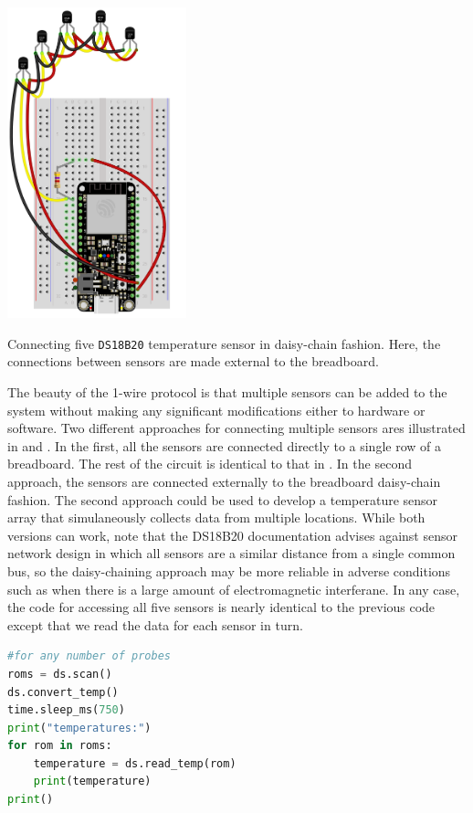\begin{marginfigure}[9 cm]
	\begin{center}
		\includegraphics[height=9cm]{Images/fiveDS18B20series.png}
		\caption[DS18B20 daisy chain]{Connecting five \texttt{DS18B20} temperature sensor in daisy-chain fashion.  Here, the connections between sensors are made external to the breadboard.}
	\end{center}
\end{marginfigure}

The beauty of the 1-wire protocol is that multiple sensors can be added to the system without making any significant modifications either to hardware or software.
Two different approaches for connecting multiple sensors ares illustrated in  and . 
In the first, all the sensors are connected directly to a single row of a breadboard.  
The rest of the circuit is identical to that in . 
In the second approach, the sensors are connected externally to the breadboard daisy-chain fashion.  
The second approach could be used to develop a temperature sensor array that simulaneously collects data from multiple locations.
While both versions can work, note that the DS18B20 documentation advises against sensor network design in which all sensors are a similar distance from a single common bus, so the daisy-chaining approach may be more reliable in adverse conditions such as when there is a large amount of electromagnetic interferane.
In any case, the code for accessing all five sensors is nearly identical to the previous code except that we read the data for each sensor in turn. 

\begin{lstlisting}[language=Python]
#for any number of probes
roms = ds.scan()
ds.convert_temp()
time.sleep_ms(750)
print("temperatures:")  
for rom in roms:
	temperature = ds.read_temp(rom)
	print(temperature)
print()
\end{lstlisting}

